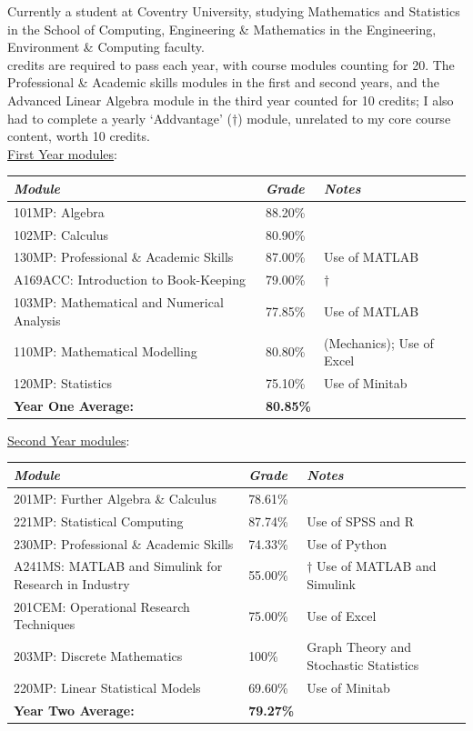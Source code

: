 \documentclass[9pt,a4paper]{article}
\begin{document}
Currently a student at Coventry University, studying Mathematics and Statistics in the School of Computing, Engineering \& Mathematics in the Engineering, Environment \& Computing faculty. \\  credits are required to pass each year, with course modules counting for 20. The Professional \& Academic skills modules in the first and second years, and the Advanced Linear Algebra module in the third year counted for 10 credits; I also had to complete a yearly `Addvantage' ($\dagger$) module, unrelated to my core course content, worth 10 credits.\\\linebreak
\underline{First Year modules}: \\
\begin{tabular}{p{6.2cm}|p{1.1cm}|p{3.5cm}}
	\emph{Module}&\emph{Grade}&\emph{Notes}\\\hline\hline
	101MP: Algebra&88.20\%&\\\hdashline
	102MP: Calculus&80.90\%&\\\hdashline
	130MP: Professional \& Academic Skills&87.00\%&Use of MATLAB\\\hdashline
	A169ACC: Introduction to Book-Keeping&79.00\%&$\dagger$\\\hdashline
	103MP: Mathematical and Numerical Analysis&77.85\%&Use of MATLAB\\\hdashline
	110MP: Mathematical Modelling&80.80\%&(Mechanics); Use of Excel\\\hdashline
	120MP: Statistics&75.10\%&Use of Minitab\\\hline
	\textbf{Year One Average:}&\textbf{80.85\%}
\end{tabular}
\pagebreak


\noindent\underline{Second Year modules}: \\
\begin{tabular}{p{6.2cm}|p{1.1cm}|p{3.5cm}}
	\emph{Module}						&\emph{Grade}	&\emph{Notes}\\\hline\hline
	201MP: Further Algebra \& Calculus	&78.61\%		&\\\hdashline
	221MP: Statistical Computing		&87.74\%		&Use of SPSS and R\\\hdashline
	230MP: Professional \& Academic Skills&74.33\%		&Use of Python\\\hdashline
	A241MS: MATLAB and Simulink for Research in Industry&55.00\%&$\dagger$ Use of MATLAB and Simulink\\\hdashline
	201CEM: Operational Research Techniques&75.00\%	&Use of Excel\\\hdashline
	203MP: Discrete Mathematics			&100\%			&Graph Theory and Stochastic Statistics\\\hdashline
	220MP: Linear Statistical Models	&69.60\%&Use of Minitab\\\hline
	\textbf{Year Two Average:}&\textbf{79.27\%}
\end{tabular}
\vspace{7mm}
\end{document}
